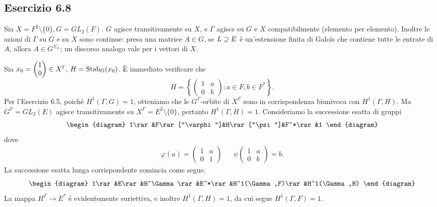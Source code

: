 \documentclass[a4paper]{article}
\newcommand*{\vectwo}[2]{\begin{pmatrix}#1\\#2\end{pmatrix}}
\newcommand*{\mattwo}[4]{\begin{pmatrix}#1&#2\\#3&#4\end{pmatrix}}
\begin{document}
\subsection*{Esercizio 6.8}
Sia $X=F^2\setminus\{0\}\comma G=GL_2(F)$. $G$ agisce transitivamente su $X$, e $\Gamma$ agisce su $G$ e $X$ compatibilmente (elemento per elemento). Inoltre le azioni di $\Gamma$ su $G$ e su $X$ sono continue: presa una matrice $A\in G$, se $L\supseteq E$ è un'estensione finita di Galois che contiene tutte le entrate di $A$, allora $A\in G^{\Sigma_L}$; un discorso analogo vale per i vettori di $X$.

Sia $x_0=\vectwo{1}{0}\in X^\Gamma\comma H=\Stab_G(x_0)$. È immediato verificare che
$$
H=\left\{\mattwo{1}{a}{0}{b}:a\in F,b\in F^*\right\}.
$$
Per l'Esercizio 6.5, poiché $H^1(\Gamma,G)=1$, otteniamo che le $G^\Gamma$-orbite di $X^\Gamma$ sono in corrispondenza biunivoca con $H^1(\Gamma,H)$. Ma $G^\Gamma=GL_2(E)$ agisce transitivamente su $X^\Gamma=E^2\setminus\{0\}$, pertanto $H^1(\Gamma,H)=1$. Consideriamo la successione esatta di gruppi
$$
\begin{diagram}
1\rar&F\rar["\varphi"]&H\rar["\psi"]&F^*\rar&1
\end{diagram}
$$
dove
\begin{align*}
\varphi(a)=\mattwo{1}{a}{0}{1}&&\psi\mattwo{1}{a}{0}{b}=b.
\end{align*}
La successione esatta lunga corrispondente comincia come segue.
$$
\begin{diagram}
1\rar&E\rar&H^\Gamma\rar&E^*\rar&H^1(\Gamma,F)\rar&H^1(\Gamma,H)
\end{diagram}
$$
La mappa $H^\Gamma\rightarrow E^*$ è evidentemente suriettiva, e inoltre $H^1(\Gamma,H)=1$, da cui segue $H^1(\Gamma,F)=1$.
\end{document}
